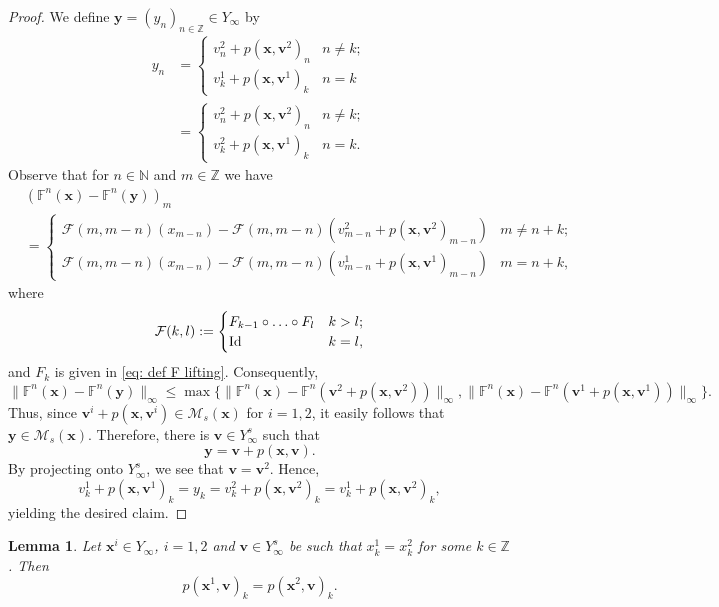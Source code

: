 \documentclass[reqno, a4paper, 10pt]{amsart}
\theoremstyle{plain}
\numberwithin{equation}{section}
\newtheorem{lemma}{Lemma}
\theoremstyle{remark}
\def\Id{\text{\rm Id}}
\begin{document}
\begin{proof}
We define $\mathbf y=(y_n)_{n\in \mathbb Z}\in Y_\infty$ by
\[
\begin{split}
y_n &=\begin{cases}
v_n^2+p(\mathbf x, \mathbf v^2)_n & n\neq k; \\
v_k^1+p(\mathbf x, \mathbf v^1)_k & n=k
\end{cases} \\
&=\begin{cases}
v_n^2+p(\mathbf x, \mathbf v^2)_n & n\neq k; \\
v_k^2+p(\mathbf x, \mathbf v^1)_k & n=k.
\end{cases}
\end{split}
\]
Observe that for $n\in \mathbb N$ and $m\in \mathbb Z$ we have 
\[
\begin{split}
&(\mathbb F^n(\mathbf x)-\mathbb F^n(\mathbf y))_m \\
&=
\begin{cases}
\mathcal F(m, m-n)(x_{m-n})-\mathcal F(m, m-n)(v_{m-n}^2+p(\mathbf x, \mathbf v^2)_{m-n}) & m\neq n+k; \\
\mathcal F(m, m-n)(x_{m-n})-\mathcal F(m, m-n)(v_{m-n}^1+p(\mathbf x, \mathbf v^1)_{m-n}) &m=n+k, 
\end{cases}
\end{split}
\]
where 
\[
\mathcal F(k, l):=\begin{cases}
F_{k-1} \circ \ldots \circ F_l & k>l; \\
\Id & k=l,
\end{cases}
\]
and $F_k$ is given in \eqref{eq: def F lifting}.
Consequently,
\[
\|\mathbb F^n(\mathbf x)-\mathbb F^n(\mathbf y)\|_\infty\le \max \{\|\mathbb F^n(\mathbf x)-\mathbb F^n(\mathbf v^2+p(\mathbf x, \mathbf v^2))\|_\infty,  \|\mathbb F^n(\mathbf x)-\mathbb F^n(\mathbf v^1+p(\mathbf x, \mathbf v^1))\|_\infty \}.
\]
Thus, since $\mathbf v^i+p(\mathbf x, \mathbf v^i)\in  \mathcal M_s(\mathbf x)$ for $i=1,2$, it easily follows that $\mathbf y\in \mathcal M_s(\mathbf x)$. Therefore, there is $\mathbf v\in Y_\infty^s$ such that
\[
\mathbf y=\mathbf v+p(\mathbf x, \mathbf v).
\]
By projecting onto $Y_\infty^s$, we see that $\mathbf v=\mathbf v^2$. Hence, 
\[
v_k^1+p(\mathbf x, \mathbf v^1)_k=y_k=v_k^2+p(\mathbf x, \mathbf v^2)_k=v_k^1+p(\mathbf x, \mathbf v^2)_k,
\]
yielding the desired claim.
\end{proof}

\begin{lemma}\label{lem p x k depends only on xk}
Let $\mathbf x^i\in Y_\infty$, $i=1, 2$ and $\mathbf v\in Y_\infty^s$ be such that $x_k^1=x_k^2$ for some $k\in \mathbb Z$. Then
\[
p(\mathbf x^1, \mathbf v)_k=p(\mathbf x^2, \mathbf v)_k.
\]
\end{lemma}
\end{document}
